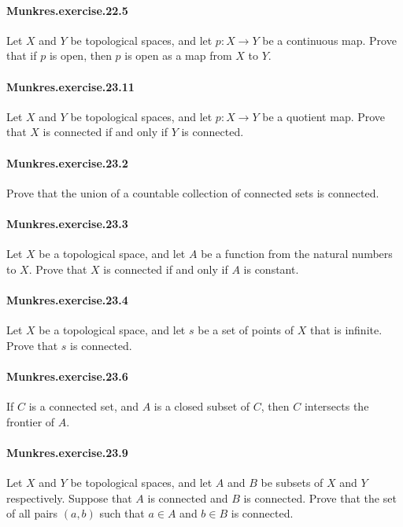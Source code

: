 \documentclass{article}
\begin{document}
\paragraph{Munkres.exercise.22.5} Let $X$ and $Y$ be topological spaces, and let $p:X\to Y$ be a continuous map. Prove that if $p$ is open, then $p$ is open as a map from $X$ to $Y$.

\paragraph{Munkres.exercise.23.11} Let $X$ and $Y$ be topological spaces, and let $p : X \to Y$ be a quotient map. Prove that $X$ is connected if and only if $Y$ is connected.

\paragraph{Munkres.exercise.23.2} Prove that the union of a countable collection of connected sets is connected.

\paragraph{Munkres.exercise.23.3} Let $X$ be a topological space, and let $A$ be a function from the natural numbers to $X$. Prove that $X$ is connected if and only if $A$ is constant.

\paragraph{Munkres.exercise.23.4} Let $X$ be a topological space, and let $s$ be a set of points of $X$ that is infinite. Prove that $s$ is connected.

\paragraph{Munkres.exercise.23.6} If $C$ is a connected set, and $A$ is a closed subset of $C$, then $C$ intersects the frontier of $A$.

\paragraph{Munkres.exercise.23.9} Let $X$ and $Y$ be topological spaces, and let $A$ and $B$ be subsets of $X$ and $Y$ respectively. Suppose that $A$ is connected and $B$ is connected. Prove that the set of all pairs $(a, b)$ such that $a \in A$ and $b \in B$ is connected.
\end{document}
